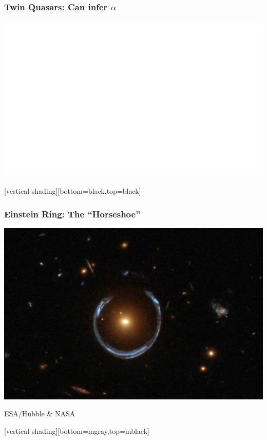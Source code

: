 \documentclass{beamer}
\begin{document}
\frame
{
    \frametitle{Twin Quasars: {\color{gold} Can infer $\alpha$}}

    \begin{center}
        \includegraphics[width=\textwidth]{glensing.png}
    \end{center}
}


{
    [vertical shading][bottom=black,top=black]
	
    \frame
    {
        \frametitle{Einstein Ring: The ``Horseshoe''}

        \begin{center}
            \includegraphics[height=0.7\textheight]{A_Horseshoe_Einstein_Ring_from_Hubble.JPG}

            {\tiny \hfill ESA/Hubble \& NASA}
        \end{center}
    }

    [vertical shading][bottom=mgray,top=mblack]

}
\end{document}
